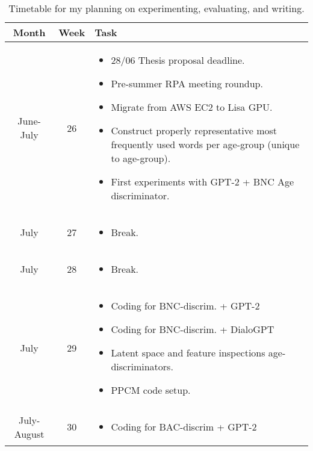 

\begin{longtable}{| c | c | m{10cm} |}
\caption{Timetable for my planning on experimenting, evaluating, and writing.}
\label{tab:plan}\\
        \hline
        \textbf{Month} & \textbf{Week} & \textbf{Task} \\
        \hline
        June-July & 26 & \begin{itemize} 
                            \item 28/06 Thesis proposal deadline. 
                            \item Pre-summer RPA meeting roundup.
                            \item Migrate from AWS EC2 to Lisa GPU.
                            \item Construct properly representative most frequently used words per age-group (unique to age-group).
                            \item First experiments with GPT-2 + BNC Age discriminator.
                        \end{itemize} \\
        \hline
        July & 27 & \begin{itemize}
                        \item  Break.
                    \end{itemize}\\
        \hline
        July & 28 & \begin{itemize}
                        \item Break.
                    \end{itemize}\\
        \hline
        July & 29 & \begin{itemize}
                        \item Coding for BNC-discrim. + GPT-2
                        \item Coding for BNC-discrim. + DialoGPT
                        \item Latent space and feature inspections age-discriminators.
                        \item PPCM code setup.
                    \end{itemize}\\
        \hline
        July-August & 30 &  \begin{itemize}
                                \item Coding for BAC-discrim + GPT-2

\end{itemize}
\end{longtable}

